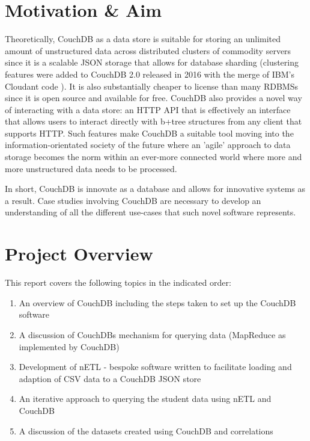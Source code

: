 \section{Motivation \& Aim}
Theoretically, CouchDB as a data store is suitable for storing an unlimited amount of unstructured data across distributed clusters of commodity servers since it is a scalable JSON storage that allows for database sharding (clustering features were added to CouchDB 2.0 released in 2016 with the merge of IBM's Cloudant code \cite{couchdb2.0}). It is also substantially cheaper to license than many RDBMSs since it is open source and available for free. CouchDB also provides a novel way of interacting with a data store: an HTTP API that is effectively an interface that allows users to interact directly with b+tree structures from any client that supports HTTP. Such features make CouchDB a suitable tool moving into the information-orientated society of the future where an 'agile' approach to data storage becomes the norm within an ever-more connected world where more and more unstructured data needs to be processed.

In short, CouchDB is innovate as a database and allows for innovative systems as a result. Case studies involving CouchDB are necessary to develop an understanding of all the different use-cases that such novel software represents.

\section{Project Overview}
This report covers the following topics in the indicated order:

\begin{enumerate}
    \item An overview of CouchDB including the steps taken to set up the CouchDB software
    \item A discussion of CouchDBs mechanism for querying data (MapReduce as implemented by CouchDB)
    \item Development of nETL - bespoke software written to facilitate loading and adaption of CSV data to a CouchDB JSON store
    \item An iterative approach to querying the student data using nETL and CouchDB
    \item A discussion of the datasets created using CouchDB and correlations
\end{enumerate}

